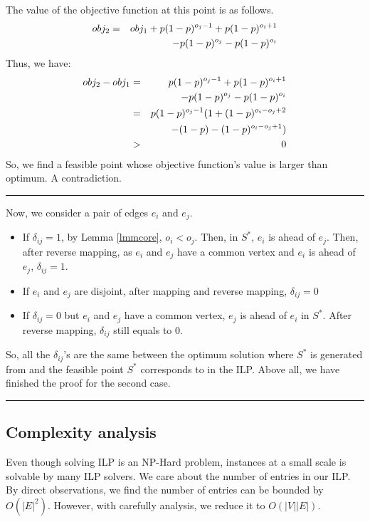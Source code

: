 \documentclass[letterpaper]{article}
\newenvironment{proof}{{Proof:}}{\hfill\rule{2mm}{2mm}}
\begin{document}
\begin{proof}
\begin{proof}
		The value of the objective function at this point is as follows.
		\begin{eqnarray}
		\tiny
		obj_2&=& obj_1+p(1-p)^{o_j-1}+p(1-p)^{o_i+1}\nonumber\\&&-p(1-p)^{o_j}-p(1-p)^{o_i}
		\end{eqnarray} 
		Thus, we have:
		\begin{eqnarray}
		\tiny
		obj_2-obj_1&=& p(1-p)^{o_j-1}+p(1-p)^{o_i+1}\nonumber\\&&-p(1-p)^{o_j}-p(1-p)^{o_i}\nonumber\\
		&=& p(1-p)^{o_j-1}(1+(1-p)^{o_i-o_j+2}\nonumber\\&& -(1-p)-(1-p)^{o_i-o_j+1})\nonumber\\
		&>& 0\nonumber
		\end{eqnarray}
		So, we find a feasible point whose objective function's value is larger than optimum.
		A contradiction.
	\end{proof}
	Now, we consider a pair of edges $e_i$ and $e_j$. 
	\begin{itemize}
		\item If $\delta_{ij}=1$, by Lemma \ref{lmmcore}, $o_i<o_j$. 
		Then, in $S^*$, $e_i$ is ahead of $e_j$.
		Then, after reverse mapping, as $e_i$ and $e_j$ have a common vertex and $e_i$ is ahead of $e_j$, $\delta_{ij}=1$.
		\item If $e_i$ and $e_j$ are disjoint, after mapping and reverse mapping, $\delta_{ij}=0$
		\item If $\delta_{ij}=0$ but $e_i$ and $e_j$ have a common vertex, $e_j$ is ahead of $e_i$ in $S^*$.
		After reverse mapping, $\delta_{ij}$ still equals to 0.
	\end{itemize}
	So, all the $\delta_{ij}$'s are the same between the optimum solution where $S^*$ is generated from and the feasible point $S^*$ corresponds to in the ILP.
	Above all, we have finished the proof for the second case. 
\end{proof}

\subsection{Complexity analysis}

Even though solving ILP is an NP-Hard problem, instances at a small scale is solvable by many ILP solvers.
We care about the number of entries in our ILP.
By direct observations, we find the number of entries can be bounded by $O(|E|^2)$.
However, with carefully analysis, we reduce it to $O(|V||E|)$.
\end{document}
